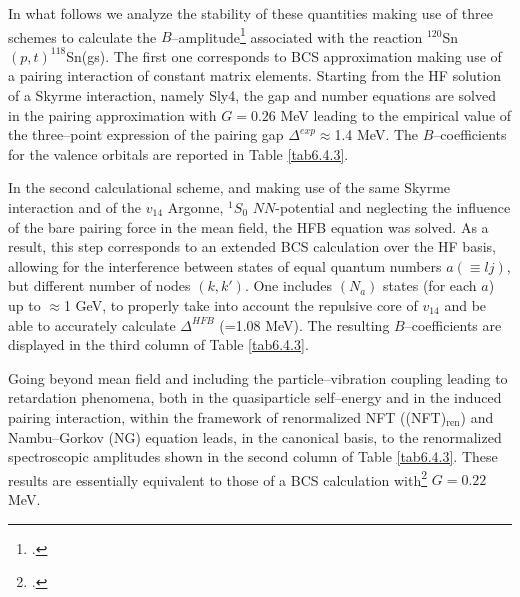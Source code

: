  In what follows we analyze the stability of these quantities making use of three schemes to calculate the $B$--amplitude\footnote{\cite{Potel:17}.} associated with the reaction $^{120}$Sn$(p,t)^{118}$Sn(gs). The first one corresponds to BCS approximation making use of a pairing interaction of constant matrix elements.  Starting from the HF solution of a Skyrme interaction, namely Sly4, the gap and number equations are solved in the pairing approximation with $G=0.26$ MeV leading to the empirical value of the three--point expression of the pairing gap $\Delta^{exp}\approx$1.4 MeV. The $B$--coefficients for the valence orbitals are reported in Table \ref{tab6.4.3}. 


In the second calculational scheme, and making use of the same Skyrme interaction and of the $v_{14}$ Argonne, $^1S_0$ $NN$-potential and neglecting the influence of the bare
pairing force in the mean field,
the HFB equation was solved. As a result, this step corresponds to an extended BCS calculation over the HF basis, allowing for the 
interference between states of equal quantum numbers $a (\equiv lj)$, but different number of nodes $(k,k')$. One includes $(N_a)$ states
(for each $a$) up to $\approx $1 GeV, to properly take into account  the repulsive core of $v_{14}$ and be able to accurately calculate 
$\Delta^{HFB}$ (=1.08 MeV). The resulting $B$--coefficients are displayed in the third column of Table \ref{tab6.4.3}.


 Going beyond mean field and including the particle--vibration coupling leading to retardation phenomena, both in the quasiparticle self--energy and in the  induced pairing interaction, within the framework of renormalized NFT ((NFT)$_{\text{ren}}$) and Nambu--Gorkov (NG) equation leads, in the canonical basis, to the renormalized spectroscopic amplitudes shown in the second column of Table \ref{tab6.4.3}. These results are essentially equivalent to those of a BCS calculation with\footnote{\cite{Idini:15}.} $G=0.22$ MeV. 

